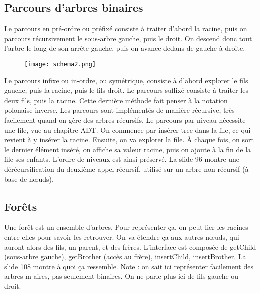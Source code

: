 \documentclass[10pt]{article}
\begin{document}
\subsection{Parcours d'arbres binaires} 
Le parcours en pré-ordre ou préfixé consiste à traiter d'abord la racine, puis on parcours récursivement le sous-arbre gauche, puis le droit. On descend donc tout l'arbre le long de son arrête gauche, puis on avance dedans de gauche à droite. 
\begin{figure}[h!]
  \texttt{[image: schema2.png]}
\end{figure}
\newline
Le parcours infixe ou in-ordre, ou symétrique, consiste à d'abord explorer le fils gauche, puis la racine, puis le fils droit. Le parcours suffixé consiste à traiter les deux fils, puis la racine. Cette dernière méthode fait penser à la notation polonaise inverse. 
\newline \newline 
Les parcours sont implémentés de manière récursive, très facilement quand on gère des arbres récursifs. Le parcours par niveau nécessite une file, vue au chapitre ADT. On commence par insérer tree dans la file, ce qui revient à y insérer la racine. Ensuite, on va explorer la file. À chaque fois, on sort le dernier élément inséré, on affiche sa valeur racine, puis on ajoute à la fin de la file ses enfants. L'ordre de niveaux est ainsi préservé.  
\newline \newline 
La slide 96 montre une dérécursification du deuxième appel récursif, utilisé sur un arbre non-récursif (à base de nœuds).
\subsection{Forêts}
Une forêt est un ensemble d'arbres. Pour représenter ça, on peut lier les racines entre elles pour savoir les retrouver. On va étendre ça aux autres nœuds, qui auront alors des fils, un parent, et des frères. 
\newline \newline 
L'interface est composée de getChild (sous-arbre gauche), getBrother (accès au frère), insertChild, insertBrother. La slide 108 montre à quoi ça ressemble. 
\newline \newline 
Note : on sait ici représenter facilement des arbres m-aires, pas seulement binaires. On ne parle plus ici de fils gauche ou droit. 
\newpage
\end{document}
